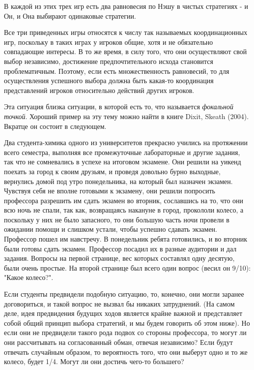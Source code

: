 {В каждой из этих трех игр есть два равновесия по Нэшу в чистых
стратегиях - и Он, и Она выбирают одинаковые стратегии.

Все три приведенных игры относятся к числу так называемых
координационных игр, поскольку в таких играх у игроков общие,
хотя и не обязательно совпадающие интересы. В то же время, в силу
того, что они осуществляют свой выбор независимо, достижение
предпочтительного исхода становится проблематичным. Поэтому, если
есть множественность равновесий, то для осуществления успешного
выбора должна быть какая-то координация представлений игроков
относительно действий других игроков.

Эта ситуация близка ситуации, в которой есть то, что называется
\emph{фокальной точкой}. Хороший пример на эту тему можно найти
в книге Dixit, Skeath (2004). Вкратце он состоит в следующем.

Два студента-химика одного из университетов прекрасно учились на
протяжении всего семестра, выполняя все промежуточные лабораторные
и другие задания, так что не сомневались в успехе на итоговом экзамене.
Они решили на уикенд поехать за город к своим друзьям,
и проведя довольно бурно выходные, вернулись домой под утро понедельника,
на который был назначен экзамен. Чувствуя себя не вполне готовыми к экзамену,
они решили попросить профессора разрешить им сдать экзамен во вторник,
сославшись на то, что они всю ночь не спали, так как, возвращаясь накануне
в город, прокололи колесо, а поскольку у них не было запасного, то они большую
часть ночи провели в ожидании помощи и слишком устали, чтобы успешно
сдавать экзамен. Профессор пошел им навстречу. В понедельник ребята готовились,
и во вторник были готовы сдать экзамен. Профессор посадил их
в разные аудитории и дал задания. Вопросы на первой странице, вес которых
составлял одну десятую, были очень простые. На второй странице был всего один
вопрос (весил он 9/10): "Какое колесо?".

Если студенты предвидели подобную ситуацию, то, конечно, они могли заранее
договориться, и такой вопрос не вызвал бы никаких затруднений. (На самом
деле, идея предвидения будущих ходов является крайне важной и представляет
собой общий принцип выбора стратегий, и мы будем говорить об этом ниже).
Но если они не предвидели такого рода подвох со стороны профессора, то
могут ли они рассчитывать на согласованный обман, отвечая независимо? Если
будут отвечать случайным образом, то вероятность того, что они выберут одно
и то же колесо, будет 1/4. Могут ли они достичь чего-то большего?

}
